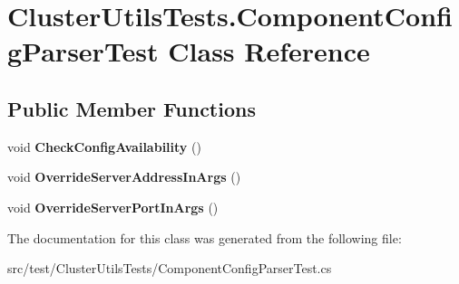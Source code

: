 \hypertarget{class_cluster_utils_tests_1_1_component_config_parser_test}{}\section{Cluster\+Utils\+Tests.\+Component\+Config\+Parser\+Test Class Reference}
\label{class_cluster_utils_tests_1_1_component_config_parser_test}
\subsection*{Public Member Functions}
\begin{DoxyCompactItemize}
\item 
\hypertarget{class_cluster_utils_tests_1_1_component_config_parser_test_aa1699ad95c3b51b23c17141e0876be8b}{}void {\bfseries Check\+Config\+Availability} ()\label{class_cluster_utils_tests_1_1_component_config_parser_test_aa1699ad95c3b51b23c17141e0876be8b}

\item 
\hypertarget{class_cluster_utils_tests_1_1_component_config_parser_test_a1cc5814ea337b0cacf2c7eefa40b2782}{}void {\bfseries Override\+Server\+Address\+In\+Args} ()\label{class_cluster_utils_tests_1_1_component_config_parser_test_a1cc5814ea337b0cacf2c7eefa40b2782}

\item 
\hypertarget{class_cluster_utils_tests_1_1_component_config_parser_test_aa2b2816eac6615a82f7583e1c662b1a1}{}void {\bfseries Override\+Server\+Port\+In\+Args} ()\label{class_cluster_utils_tests_1_1_component_config_parser_test_aa2b2816eac6615a82f7583e1c662b1a1}

\end{DoxyCompactItemize}


The documentation for this class was generated from the following file\+:\begin{DoxyCompactItemize}
\item 
src/test/\+Cluster\+Utils\+Tests/Component\+Config\+Parser\+Test.\+cs\end{DoxyCompactItemize}
